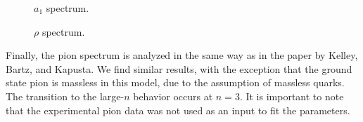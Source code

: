 \begin{figure}
\caption{$a_1$ spectrum.}
\end{figure}

\begin{figure}
\caption{$\rho$ spectrum.}
\end{figure}



Finally, the pion spectrum is analyzed in the same way as in the paper by Kelley, Bartz, and Kapusta.
 We find similar results, with the exception that the ground state pion is massless in this model, due to the assumption of massless quarks. 
 The transition to the large-$n$ behavior occurs at $n=3$. 
 It is important to note that the experimental pion data was not used as an input to fit the parameters.

